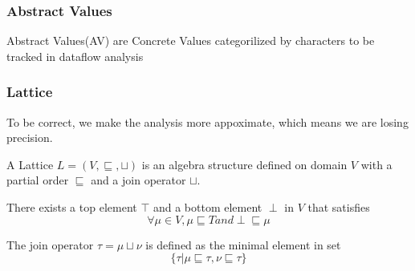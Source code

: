 \documentclass[]{beamer}
\begin{document}
\begin{frame}[t]
  \frametitle{Abstract Values}
  \alert{Abstract Values(AV)} are Concrete Values categorilized by characters to be tracked in
  dataflow analysis


\end{frame}

\begin{frame}
  \frametitle{Lattice}
  To be correct, we make the analysis more appoximate, which means we are losing precision.

  \vspace{1em}\pause
  A \alert{Lattice} $L=(V, \sqsubseteq, \sqcup)$ is an algebra structure defined on domain $V$ with a
  \alert{partial order} $\sqsubseteq$ and a \alert{join operator} $\sqcup$.

  \vspace{1em}\pause
  There exists a \alert{top} element $\top$ and a \alert{bottom} element $\perp$ in $V$ that satisfies
  $$\forall \mu \in V, \mu \sqsubseteq T and \perp \sqsubseteq \mu$$

  \vspace{1em}\pause
  The join operator $\tau = \mu \sqcup \nu$ is defined as the minimal element in set
  $$\{\tau | \mu \sqsubseteq \tau, \nu \sqsubseteq \tau\}$$
\end{frame}
\end{document}
